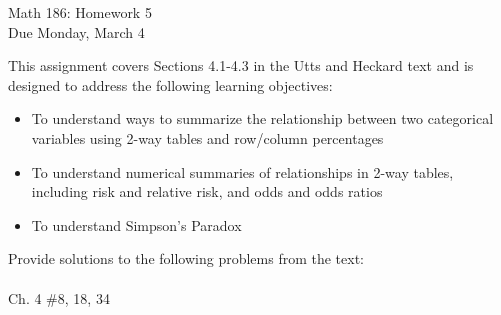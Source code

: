 \documentclass{article}
\begin{document}
\begin{center}
  \Large Math 186: Homework 5\\
  \Large Due Monday, March 4
  \end{center}

This assignment covers Sections 4.1-4.3 in the Utts and Heckard text and is designed to address the following learning objectives:\\

\begin{itemize}
\item To understand ways to summarize the relationship between two categorical variables using 2-way tables and row/column percentages
\item To understand numerical summaries of relationships in 2-way tables, including risk and relative risk, and odds and odds ratios
\item To understand Simpson's Paradox
\end{itemize}

\hrulefill
\vspace{.2in}

\noindent
Provide solutions to the following problems from the text:\\ \\
Ch. 4 \#8, 18, 34
\end{document}

